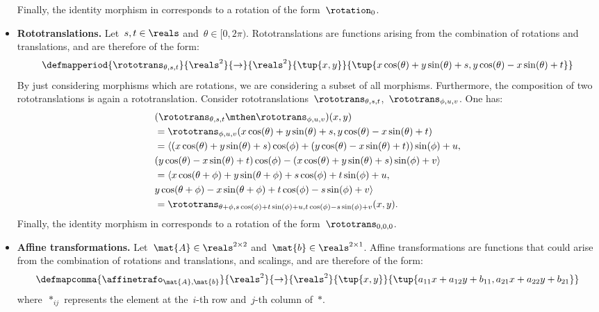 \begin{solution}
\begin{itemize}
\begin{equation*}
              \end{equation*}
              Finally, the identity morphism in \Draw corresponds to a rotation of the form~$\rotation_{0}$.
        \item \textbf{Rototranslations.}
              Let~$s,t\in \reals$ and~$\theta \in [0,2\pi)$.
              Rototranslations are functions arising from the combination of rotations and translations, and are therefore of the form:
              \begin{equation*}
                  \defmapperiod{\rototrans_{\theta,s,t}}{\reals^2}{\to}{\reals^2}{\tup{x,y}}{\tup{x\cos(\theta)+y\sin(\theta)+s, y\cos(\theta)-x\sin(\theta)+t}}
              \end{equation*}
              By just considering morphisms which are rotations, we are considering a subset of all morphisms.
              Furthermore, the composition of two rototranslations is again a rototranslation.
              Consider rototranslations~$\rototrans_{\theta,s,t}$,~$\rototrans_{\phi,u,v}$.
              One has:
              \begin{equation*}
                  \begin{aligned}
                       & (\rototrans_{\theta,s,t}\mthen \rototrans_{\phi,u,v})(x,y) \\
                       & =\rototrans_{\phi,u,v}(x\cos(\theta)+y\sin(\theta)+s, y\cos(\theta)-x\sin(\theta)+t) \\
                       & =\langle(x\cos(\theta)+y\sin(\theta)+s)\cos(\phi)+(y\cos(\theta)-x\sin(\theta)+t))\sin(\phi)+u, \\
                       & (y\cos(\theta)-x\sin(\theta)+t)\cos(\phi) - (x\cos(\theta)+y\sin(\theta)+s)\sin(\phi)+v\rangle \\
                       & =\langle x\cos(\theta+\phi)+y\sin(\theta+\phi)+s\cos(\phi)+t\sin(\phi)+u, \\
                       & y\cos(\theta+\phi)-x\sin(\theta+\phi)+t\cos(\phi)-s\sin(\phi)+v\rangle \\
                       & =\rototrans_{\theta+\phi,s\cos(\phi)+t\sin(\phi)+u, t\cos(\phi)-s\sin(\phi)+v}(x,y).
                  \end{aligned}
              \end{equation*}
              Finally, the identity morphism in \Draw corresponds to a rotation of the form~$\rototrans_{0,0,0}$.
        \item \textbf{Affine transformations.}
              Let~$\mat{A}\in \reals^{2\times 2}$ and~$\mat{b}\in \reals^{2\times 1}$.
              Affine transformations are functions that could arise from the combination of rotations and translations, and scalings, and are therefore of the form:
              \begin{equation*}
                  \defmapcomma{\affinetrafo_{\mat{A},\mat{b}}}{\reals^2}{\to}{\reals^2}{\tup{x,y}}{\tup{a_{11}x+a_{12}y+b_{11},a_{21}x+a_{22}y+b_{21}}}
              \end{equation*}
              where~$*_{ij}$ represents the element at the~$i$-th row and~$j$-th column of~$*$.


\end{itemize}
\end{solution}
